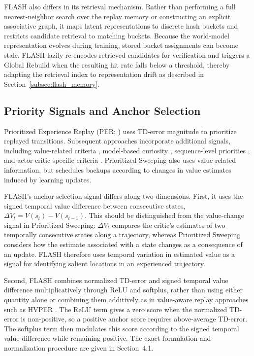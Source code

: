 \documentclass{article} %
\begin{document}
FLASH also differs in its retrieval mechanism. Rather than performing a full nearest-neighbor search over the replay memory or constructing an explicit associative graph, it maps latent representations to discrete hash buckets and restricts candidate retrieval to matching buckets. Because the world-model representation evolves during training, stored bucket assignments can become stale. FLASH lazily re-encodes retrieved candidates for verification and triggers a Global Rebuild when the resulting hit rate falls below a threshold, thereby adapting the retrieval index to representation drift as described in Section~\ref{subsec:flash_memory}.

\subsection{Priority Signals and Anchor Selection}

Prioritized Experience Replay (PER; \citealp{schaul2015prioritized}) uses TD-error magnitude to prioritize replayed transitions. Subsequent approaches incorporate additional signals, including value-related criteria \citep{cao2019high}, model-based curiosity \citep{kauvar2023curious}, sequence-level priorities \citep{karimpanal2018experience, brittain2019prioritized}, and actor-critic-specific criteria \citep{saglam2023actor}. Prioritized Sweeping \citep{moore1993prioritized} also uses value-related information, but schedules backups according to changes in value estimates induced by learning updates.

FLASH's anchor-selection signal differs along two dimensions. First, it uses the signed temporal value difference between consecutive states, $\Delta V_t = V(s_t)-V(s_{t-1})$. This should be distinguished from the value-change signal in Prioritized Sweeping: $\Delta V_t$ compares the critic's estimates of two temporally consecutive states along a trajectory, whereas Prioritized Sweeping considers how the estimate associated with a state changes as a consequence of an update. FLASH therefore uses temporal variation in estimated value as a signal for identifying salient locations in an experienced trajectory.

Second, FLASH combines normalized TD-error and signed temporal value difference multiplicatively through ReLU and softplus, rather than using either quantity alone or combining them additively as in value-aware replay approaches such as HVPER \citep{cao2019high}. The ReLU term gives a zero score when the normalized TD-error is non-positive, so a positive anchor score requires above-average TD-error. The softplus term then modulates this score according to the signed temporal value difference while remaining positive. The exact formulation and normalization procedure are given in Section~4.1.
\end{document}
